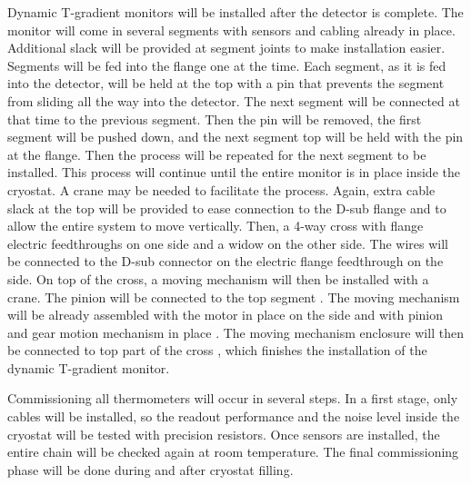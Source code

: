 Dynamic T-gradient monitors will be installed after the detector is complete.
The monitor will come in several segments with sensors and cabling already
in place. Additional slack will be provided at segment joints to make
installation easier. Segments will be fed into the flange one at the
time. Each segment, as it is fed into the detector, will be held at the top
with a pin that prevents the segment from sliding all the way into the detector. The next
segment will be connected at that time to the previous segment. Then the pin will be removed,
the first segment will be pushed down, and the next segment top will be held with the
pin at the flange. Then the process will be repeated for the next segment to be installed. This
process will continue until the entire monitor is in place
inside the cryostat. A crane may be needed to facilitate the process.
Again, extra cable slack at the top will be provided to ease connection to the D-sub flange and to allow the
entire system to move vertically.  Then,  a 4-way cross with flange electric feedthroughs on
one side and a widow  on the other side. The wires will  be connected to
the D-sub connector on the electric flange feedthrough on the side. On top of the cross, a moving mechanism  will then be installed with a crane.
The pinion will be connected to the top segment  . The moving mechanism will be already
assembled with the motor in place on the side and with pinion and gear
motion mechanism in place  . The moving mechanism enclosure  will
then be connected to top part of the cross , which finishes the
installation of the dynamic T-gradient monitor.

Commissioning all thermometers will occur in several steps. In a first stage, only cables will be installed, so
the readout performance and the noise level inside the cryostat will be
tested with precision resistors. Once sensors are installed, the entire chain will be checked again at room temperature.
The final commissioning phase will be done during and after cryostat filling.  


